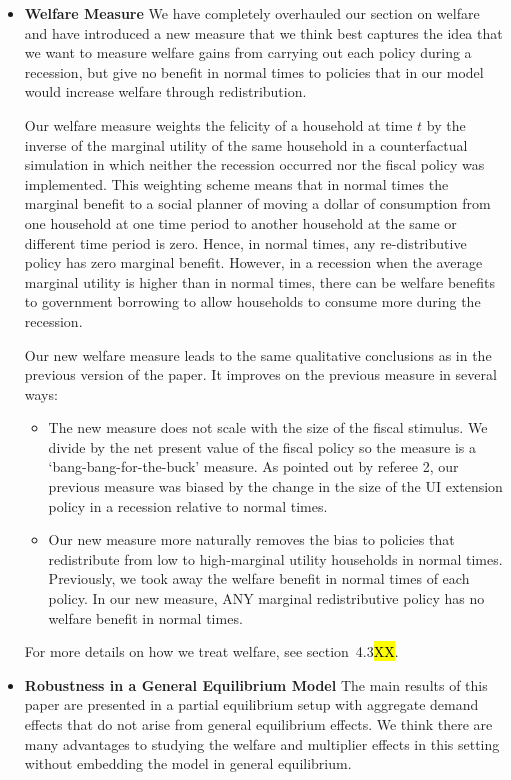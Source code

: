 \begin{itemize}
	
	\item \textbf{Welfare Measure} We have completely overhauled our section on welfare and have introduced a new measure that we think best captures the idea that we want to measure welfare gains from carrying out each policy during a recession, but give no benefit in normal times to policies that in our model would increase welfare through redistribution. 
	
	Our welfare measure weights the felicity of a household at time $t$ by the inverse of the marginal utility of the same household in a counterfactual simulation in which neither the recession occurred nor the fiscal policy was implemented. This weighting scheme means that in normal times the marginal benefit to a social planner of moving a dollar of consumption from one household at one time period to another household at the same or different time period is zero. Hence, in normal times, any re-distributive policy has zero marginal benefit. However, in a recession when the average marginal utility is higher than in normal times, there can be welfare benefits to government borrowing to allow households to consume more during the recession.
	
	Our new welfare measure leads to the same qualitative conclusions as in the previous version of the paper. It improves on the previous measure in several ways:
	\begin{itemize}
		\item The new measure does not scale with the size of the fiscal stimulus. We divide by the net present value of the fiscal policy so the measure is a `bang-bang-for-the-buck' measure. As pointed out by referee 2, our previous measure was biased by the change in the size of the UI extension policy in a recession relative to normal times.
		\item Our new measure more naturally removes the bias to policies that redistribute from low to high-marginal utility households in normal times. Previously, we took away the welfare benefit in normal times of each policy. In our new measure, ANY marginal redistributive policy has no welfare benefit in normal times.
	\end{itemize}
	For more details on how we treat welfare, see section~4.3\hl{XX}.
	
	\item \textbf{Robustness in a General Equilibrium Model}  The main results of this paper are presented in a partial equilibrium setup with aggregate demand effects that do not arise from general equilibrium effects. We think there are many advantages to studying the welfare and multiplier effects in this setting without embedding the model in general equilibrium.
	

\end{itemize}

